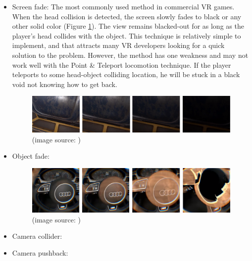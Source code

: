 \begin{itemize}
\item Screen fade: The most commonly used method in commercial VR games. When the head collision is detected, the screen slowly fades to black or any other solid color (Figure \ref{fig:SCREENFADEIMAGE}). The view remains blacked-out for as long as the player's head collides with the object. This technique is relatively simple to implement, and that attracts many VR developers looking for a quick solution to the problem. However, the method has one weakness and may not work well with the Point \& Teleport locomotion technique. If the player teleports to some head-object colliding location, he will be stuck in a black void not knowing how to get back.

\begin{figure}[th]
\centering
\includegraphics[width=1\textwidth]{img/screen_fade.png}
\caption{  (image source: \cite{SCREENFADE})}
\label{fig:SCREENFADEIMAGE}
\end{figure}

\item Object fade:

\begin{figure}[th]
\centering
\includegraphics[width=1\textwidth]{img/object_fade.png}
\caption{  (image source: \cite{OBJECTFADE})}
\label{fig:OBJECTFADEIMAGE}
\end{figure}

\item Camera collider: 
\item Camera pushback: 
\end{itemize}

